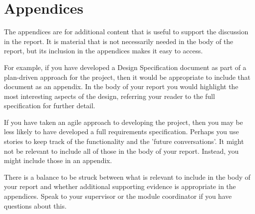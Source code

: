 \documentclass[11pt,a4paper]{report}
\begin{document}


\setemptyheader

\chapter*{Appendices}
The appendices are for additional content that is useful to support the discussion in the report. It is material that is not necessarily needed in the body of the report, but its inclusion in the appendices makes it easy to access. 

For example, if you have developed a Design Specification document as part of a plan-driven approach for the project, then it would be appropriate to include that document as an appendix. In the body of your report you would highlight the most interesting aspects of the design, referring your reader to the full specification for further detail.

If you have taken an agile approach to developing the project, then you may be less likely to have developed a full requirements specification. Perhaps you use stories to keep track of the functionality and the 'future conversations'. It might not be relevant to include all of those in the body of your report. Instead, you might include those in an appendix. 

There is a balance to be struck between what is relevant to include in the body of your report and whether additional supporting evidence is appropriate in the appendices. Speak to your supervisor or the module coordinator if you have questions about this.

\pagebreak


\appendix
{}
\fancyhead[R]{\leftmark}
\fancyhead[C]{}
\fancyfoot[C]{\thepage}
\renewcommand{\headrulewidth}{0.4pt}
\renewcommand{\chaptermark}[1]{\markboth{#1}{}}

\fancyhead[R]{\leftmark}





\fancypagestyle{plain}{%
   \fancyhead{} %
   \fancyfoot[C]{{\thepage} of \pageref{LastPage}} %
   \renewcommand{\headrulewidth}{0pt}
   \renewcommand{\footrulewidth}{0pt}
}

\end{document}
